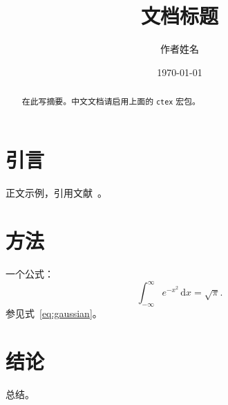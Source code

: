 \documentclass[11pt,a4paper]{article}
\title{文档标题}
\author{作者姓名}
\date{\today}
\begin{document}
\maketitle

\begin{abstract}
在此写摘要。中文文档请启用上面的 \texttt{ctex} 宏包。
\end{abstract}

\section{引言}
正文示例，引用文献~\cite{zhu2018simultaneous}。

\section{方法}
一个公式：
\begin{equation}
  \int_{-\infty}^{\infty} e^{-x^2}\,\mathrm{d}x = \sqrt{\pi}.
  \label{eq:gaussian}
\end{equation}
参见式~\eqref{eq:gaussian}。

\section{结论}
总结。

\printbibliography
\end{document}
